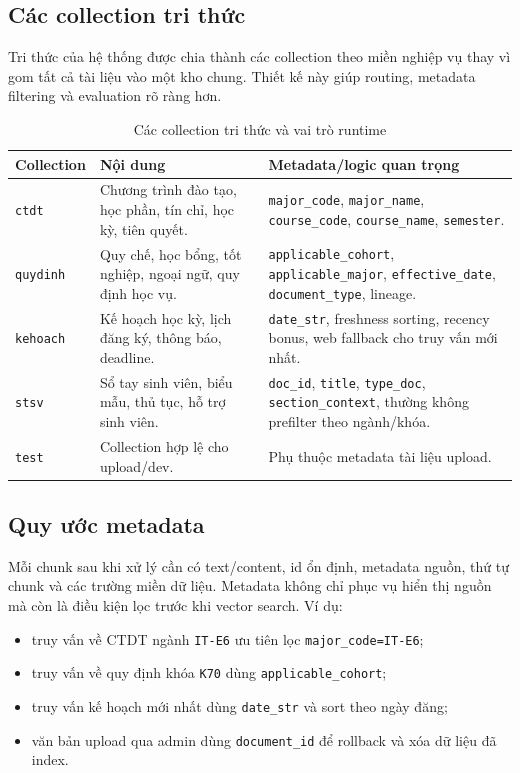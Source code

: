 \documentclass[../DoAn.tex]{subfiles}
\begin{document}
\subsection{Các collection tri thức}

Tri thức của hệ thống được chia thành các collection theo miền nghiệp vụ thay
vì gom tất cả tài liệu vào một kho chung. Thiết kế này giúp routing, metadata
filtering và evaluation rõ ràng hơn.

\begin{table}[h]
\centering
\begin{tabular}{|l|p{4.0cm}|p{5.8cm}|}
\hline
\textbf{Collection} & \textbf{Nội dung} & \textbf{Metadata/logic quan trọng} \\
\hline
\texttt{ctdt} & Chương trình đào tạo, học phần, tín chỉ, học kỳ, tiên quyết. &
\texttt{major\_code}, \texttt{major\_name}, \texttt{course\_code},
\texttt{course\_name}, \texttt{semester}. \\
\hline
\texttt{quydinh} & Quy chế, học bổng, tốt nghiệp, ngoại ngữ, quy định học vụ. &
\texttt{applicable\_cohort}, \texttt{applicable\_major},
\texttt{effective\_date}, \texttt{document\_type}, lineage. \\
\hline
\texttt{kehoach} & Kế hoạch học kỳ, lịch đăng ký, thông báo, deadline. &
\texttt{date\_str}, freshness sorting, recency bonus, web fallback cho truy vấn
mới nhất. \\
\hline
\texttt{stsv} & Sổ tay sinh viên, biểu mẫu, thủ tục, hỗ trợ sinh viên. &
\texttt{doc\_id}, \texttt{title}, \texttt{type\_doc},
\texttt{section\_context}, thường không prefilter theo ngành/khóa. \\
\hline
\texttt{test} & Collection hợp lệ cho upload/dev. & Phụ thuộc metadata tài liệu
upload. \\
\hline
\end{tabular}
\caption{Các collection tri thức và vai trò runtime}
\end{table}

\subsection{Quy ước metadata}

Mỗi chunk sau khi xử lý cần có text/content, id ổn định, metadata nguồn, thứ tự
chunk và các trường miền dữ liệu. Metadata không chỉ phục vụ hiển thị nguồn mà
còn là điều kiện lọc trước khi vector search. Ví dụ:

\begin{itemize}
    \item truy vấn về CTDT ngành \texttt{IT-E6} ưu tiên lọc
    \texttt{major\_code=IT-E6};
    \item truy vấn về quy định khóa \texttt{K70} dùng
    \texttt{applicable\_cohort};
    \item truy vấn kế hoạch mới nhất dùng \texttt{date\_str} và sort theo ngày
    đăng;
    \item văn bản upload qua admin dùng \texttt{document\_id} để rollback và
    xóa dữ liệu đã index.
\end{itemize}
\end{document}
